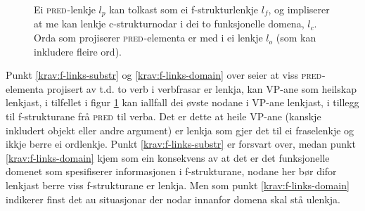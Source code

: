 \documentclass[12pt,a4paper,oneside,draft]{report}
\newcommand{\F}[2]{\textsc{#1}\ensuremath{_{#2}}}
\newcommand{\PRED}{\F{pred}{}}
\newcommand{\proj}[2]{\begin{tabular}{c}\footnotesize{#1}\\\normalsize{#2}\end{tabular}}
\newcommand{\ua}{\ensuremath{\uparrow}}
\newcommand{\da}{\ensuremath{\downarrow}}
\begin{document}
  \begin{figure}[htp]
     \centering
     
     \caption{Ei \PRED{}-lenkje $l_p$ kan tolkast som ei
     f\hyp{}strukturlenkje $l_f$, og impliserer at me kan lenkje
     c\hyp{}strukturnodar i dei to funksjonelle domena, $l_c$. Orda
     som projiserer \PRED{}-elementa er med i ei lenkje $l_o$ (som kan
     inkludere fleire ord).}
     \label{fig:viss-PRED-så-f-og-c}
     \end{figure}

Punkt \ref{krav:f-links-substr} og \ref{krav:f-links-domain} over seier at viss
\PRED{}-elementa projisert av t.d. to verb i verbfrasar er lenkja, kan
VP-ane som heilskap lenkjast, i tilfellet i figur
\ref{fig:viss-PRED-så-f-og-c} kan iallfall dei øvste nodane i VP-ane
lenkjast, i tillegg til f\hyp{}strukturane frå \PRED{} til verba.  Det er
dette at heile VP-ane (kanskje inkludert objekt eller andre argument) er lenkja som gjer
det til ei fraselenkje og ikkje berre ei ordlenkje. Punkt
\ref{krav:f-links-substr} er forsvart over, medan punkt
\ref{krav:f-links-domain} kjem som ein konsekvens av at det er det
funksjonelle domenet som spesifiserer informasjonen i f\hyp{}strukturane,
nodane her bør difor lenkjast berre viss f\hyp{}strukturane er lenkja. Men
som punkt \ref{krav:f-links-domain} indikerer finst det au situasjonar der
nodar innanfor domena skal stå ulenkja.
\end{document}
